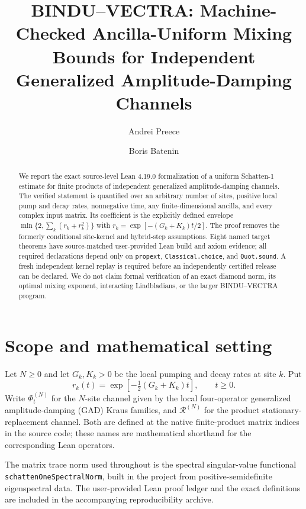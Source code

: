 \documentclass[aps,pra,reprint,superscriptaddress,amsmath,amssymb,floatfix,nofootinbib]{revtex4-2}
\newcommand{\R}{\mathcal{R}}
\begin{document}
\title{BINDU--VECTRA: Machine-Checked Ancilla-Uniform Mixing Bounds for Independent Generalized Amplitude-Damping Channels}
\author{Andrei Preece}
\author{Boris Batenin}
\begin{abstract}
We report the exact source-level Lean 4.19.0 formalization of a uniform Schatten-1 estimate for finite products of independent generalized amplitude-damping channels. The verified statement is quantified over an arbitrary number of sites, positive local pump and decay rates, nonnegative time, any finite-dimensional ancilla, and every complex input matrix. Its coefficient is the explicitly defined envelope $\min\{2,\sum_k(r_k+r_k^2)\}$ with $r_k=\exp[-(G_k+K_k)t/2]$. The proof removes the formerly conditional site-kernel and hybrid-step assumptions. Eight named target theorems have source-matched user-provided Lean build and axiom evidence; all required declarations depend only on \texttt{propext}, \texttt{Classical.choice}, and \texttt{Quot.sound}. A fresh independent kernel replay is required before an independently certified release can be declared. We do not claim formal verification of an exact diamond norm, its optimal mixing exponent, interacting Lindbladians, or the larger BINDU--VECTRA program.
\end{abstract}
\maketitle

\section{Scope and mathematical setting}
Let $N\ge0$ and let $G_k,K_k>0$ be the local pumping and decay rates at site $k$. Put
\begin{equation}
 r_k(t)=\exp\!\left[-\tfrac12(G_k+K_k)t\right],\qquad t\ge0.
\end{equation}
Write $\Phi_t^{(N)}$ for the $N$-site channel given by the local four-operator generalized amplitude-damping (GAD) Kraus families, and $\R^{(N)}$ for the product stationary-replacement channel. Both are defined at the native finite-product matrix indices in the source code; these names are mathematical shorthand for the corresponding Lean operators.

The matrix trace norm used throughout is the spectral singular-value functional \texttt{schattenOneSpectralNorm}, built in the project from positive-semidefinite eigenspectral data. The user-provided Lean proof ledger and the exact definitions are included in the accompanying reproducibility archive.
\end{document}
